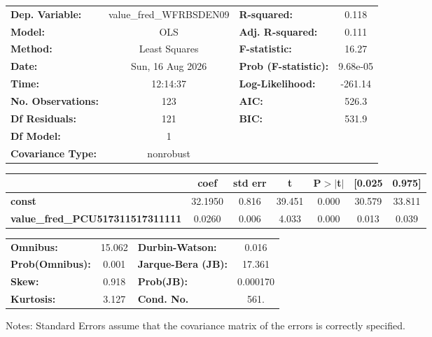 \begin{center}
\begin{tabular}{lclc}
\toprule
\textbf{Dep. Variable:}                  & value\_fred\_WFRBSDEN09 & \textbf{  R-squared:         } &     0.118   \\
\textbf{Model:}                          &           OLS           & \textbf{  Adj. R-squared:    } &     0.111   \\
\textbf{Method:}                         &      Least Squares      & \textbf{  F-statistic:       } &     16.27   \\
\textbf{Date:}                           &     Sun, 16 Aug 2026    & \textbf{  Prob (F-statistic):} &  9.68e-05   \\
\textbf{Time:}                           &         12:14:37        & \textbf{  Log-Likelihood:    } &   -261.14   \\
\textbf{No. Observations:}               &             123         & \textbf{  AIC:               } &     526.3   \\
\textbf{Df Residuals:}                   &             121         & \textbf{  BIC:               } &     531.9   \\
\textbf{Df Model:}                       &               1         & \textbf{                     } &             \\
\textbf{Covariance Type:}                &        nonrobust        & \textbf{                     } &             \\
\bottomrule
\end{tabular}
\begin{tabular}{lcccccc}
                                         & \textbf{coef} & \textbf{std err} & \textbf{t} & \textbf{P$> |$t$|$} & \textbf{[0.025} & \textbf{0.975]}  \\
\midrule
\textbf{const}                           &      32.1950  &        0.816     &    39.451  &         0.000        &       30.579    &       33.811     \\
\textbf{value\_fred\_PCU517311517311111} &       0.0260  &        0.006     &     4.033  &         0.000        &        0.013    &        0.039     \\
\bottomrule
\end{tabular}
\begin{tabular}{lclc}
\textbf{Omnibus:}       & 15.062 & \textbf{  Durbin-Watson:     } &    0.016  \\
\textbf{Prob(Omnibus):} &  0.001 & \textbf{  Jarque-Bera (JB):  } &   17.361  \\
\textbf{Skew:}          &  0.918 & \textbf{  Prob(JB):          } & 0.000170  \\
\textbf{Kurtosis:}      &  3.127 & \textbf{  Cond. No.          } &     561.  \\
\bottomrule
\end{tabular}
\end{center}

Notes: \newline
 [1] Standard Errors assume that the covariance matrix of the errors is correctly specified.